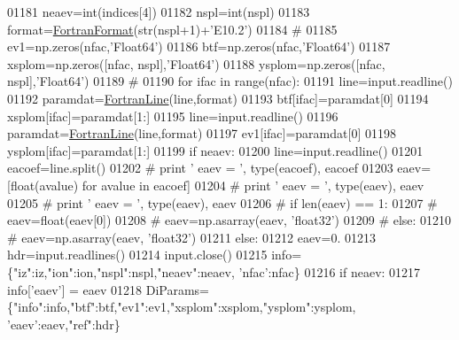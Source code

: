 \begin{DoxyCode}
{{{{{{{{{{{{01181     neaev=int(indices[4])
01182     nspl=int(nspl)
01183     format=\hyperlink{classpyneb_1_1utils_1_1_fortran_format_1_1_fortran_format}{FortranFormat}(str(nspl+1)+\textcolor{stringliteral}{'E10.2'})
01184     \textcolor{comment}{#}
01185     ev1=np.zeros(nfac,\textcolor{stringliteral}{'Float64'})
01186     btf=np.zeros(nfac,\textcolor{stringliteral}{'Float64'})
01187     xsplom=np.zeros([nfac, nspl],\textcolor{stringliteral}{'Float64'})
01188     ysplom=np.zeros([nfac, nspl],\textcolor{stringliteral}{'Float64'})
01189     \textcolor{comment}{#}
01190     \textcolor{keywordflow}{for} ifac \textcolor{keywordflow}{in} range(nfac):
01191         line=input.readline()
01192         paramdat=\hyperlink{classpyneb_1_1utils_1_1_fortran_format_1_1_fortran_line}{FortranLine}(line,format)
01193         btf[ifac]=paramdat[0]
01194         xsplom[ifac]=paramdat[1:]
01195         line=input.readline()
01196         paramdat=\hyperlink{classpyneb_1_1utils_1_1_fortran_format_1_1_fortran_line}{FortranLine}(line,format)
01197         ev1[ifac]=paramdat[0]
01198         ysplom[ifac]=paramdat[1:]
01199     \textcolor{keywordflow}{if} neaev:
01200         line=input.readline()
01201         eacoef=line.split()
01202 \textcolor{comment}{#            print ' eaev = ', type(eacoef), eacoef}
01203         eaev=[float(avalue) \textcolor{keywordflow}{for} avalue \textcolor{keywordflow}{in} eacoef]
01204 \textcolor{comment}{#            print ' eaev = ', type(eaev), eaev}
01205 \textcolor{comment}{#            print ' eaev = ', type(eaev), eaev}
01206 \textcolor{comment}{#            if len(eaev) == 1:}
01207 \textcolor{comment}{#                eaev=float(eaev[0])}
01208 \textcolor{comment}{#                eaev=np.asarray(eaev, 'float32')}
01209 \textcolor{comment}{#            else:}
01210 \textcolor{comment}{#                eaev=np.asarray(eaev, 'float32')}
01211     \textcolor{keywordflow}{else}:
01212         eaev=0.
01213     hdr=input.readlines()
01214     input.close()
01215     info=\{\textcolor{stringliteral}{"iz"}:iz,\textcolor{stringliteral}{"ion"}:ion,\textcolor{stringliteral}{"nspl"}:nspl,\textcolor{stringliteral}{"neaev"}:neaev, \textcolor{stringliteral}{'nfac'}:nfac\}
01216     \textcolor{keywordflow}{if} neaev:
01217         info[\textcolor{stringliteral}{'eaev'}] = eaev
01218     DiParams=\{\textcolor{stringliteral}{"info"}:info,\textcolor{stringliteral}{"btf"}:btf,\textcolor{stringliteral}{"ev1"}:ev1,\textcolor{stringliteral}{"xsplom"}:xsplom,\textcolor{stringliteral}{"ysplom"}:ysplom, \textcolor{stringliteral}{'eaev'}:eaev,\textcolor{stringliteral}{"ref"}:hdr\}
}}}}}}}}}}}}
\end{DoxyCode}
